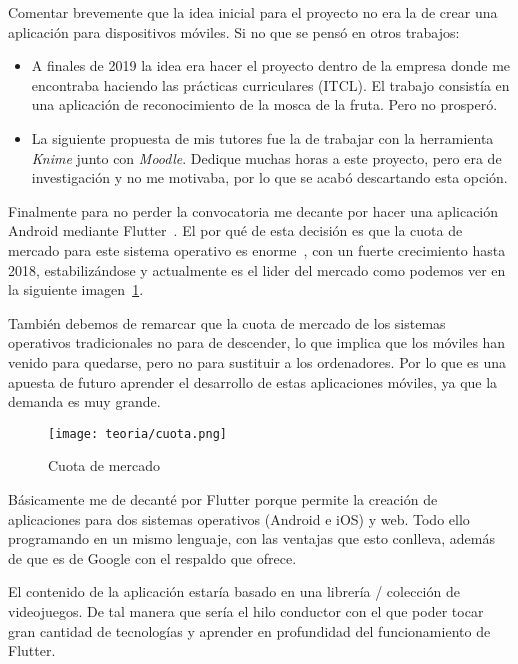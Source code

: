 
Comentar brevemente que la idea inicial para el proyecto no era la de crear una aplicación para dispositivos móviles. Si no que se pensó en otros trabajos:

\begin{itemize}
	\item A finales de 2019 la idea era hacer el proyecto dentro de la empresa donde me encontraba haciendo las prácticas curriculares (ITCL). El trabajo consistía en una aplicación de reconocimiento de la mosca de la fruta. Pero no prosperó.
	
	\item La siguiente propuesta de mis tutores fue la de trabajar con la herramienta \emph{Knime} junto con \emph{Moodle}. Dedique muchas horas a este proyecto, pero era de investigación y no me motivaba, por lo que se acabó descartando esta opción.
\end{itemize}

Finalmente para no perder la convocatoria me decante por hacer una aplicación Android mediante Flutter~\cite{wiki:flutter}. El por qué de esta decisión es que la cuota de mercado para este sistema operativo es enorme~\cite{wiki:marketOS}, con un fuerte crecimiento hasta 2018, estabilizándose y actualmente es el lider del mercado como podemos ver en la siguiente imagen~\ref{fig:cuota}. 

También debemos de remarcar que la cuota de mercado de los sistemas operativos tradicionales no para de descender, lo que implica que los móviles han venido para quedarse, pero no para sustituir a los ordenadores. Por lo que es una apuesta de futuro aprender el desarrollo de estas aplicaciones móviles, ya que la demanda es muy grande.

\begin{figure}[H]
	\centering
	\texttt{[image: teoria/cuota.png]}
	\caption{Cuota de mercado}\label{fig:cuota}
\end{figure}

Básicamente me de decanté por Flutter porque permite la creación de aplicaciones para dos sistemas operativos (Android e iOS) y web. Todo ello programando en un mismo lenguaje, con las ventajas que esto conlleva, además de que es de Google con el respaldo que ofrece. 

El contenido de la aplicación estaría basado en una librería / colección de  videojuegos. De tal manera que sería el hilo conductor con el que poder tocar gran cantidad de tecnologías y aprender en profundidad del funcionamiento de Flutter.

